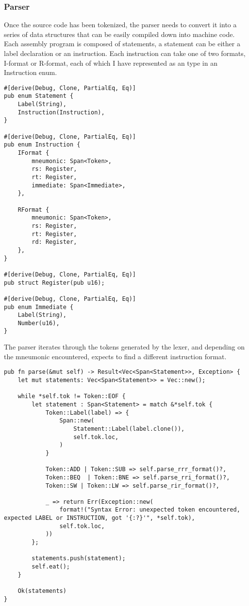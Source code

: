 \subsubsection{Parser}
Once the source code has been tokenized, the parser needs to convert it into a series of data structures that can be easily compiled down into machine code. Each assembly program is composed of statements, a statement can be either a label declaration or an instruction. Each instruction can take one of two formats, I-format or R-format, each of which I have represented as an type in an Instruction enum.

\begin{lstlisting}
#[derive(Debug, Clone, PartialEq, Eq)]
pub enum Statement {
    Label(String),
    Instruction(Instruction),
}

#[derive(Debug, Clone, PartialEq, Eq)]
pub enum Instruction {
    IFormat {
        mneumonic: Span<Token>,
        rs: Register,
        rt: Register,
        immediate: Span<Immediate>,
    },

    RFormat {
        mneumonic: Span<Token>,
        rs: Register,
        rt: Register,
        rd: Register,
    },
}

#[derive(Debug, Clone, PartialEq, Eq)]
pub struct Register(pub u16);

#[derive(Debug, Clone, PartialEq, Eq)]
pub enum Immediate {
    Label(String),
    Number(u16),
}
\end{lstlisting}

The parser iterates through the tokens generated by the lexer, and depending on the mneumonic encountered, expects to find a different instruction format.

\begin{lstlisting}
pub fn parse(&mut self) -> Result<Vec<Span<Statement>>, Exception> {
    let mut statements: Vec<Span<Statement>> = Vec::new();

    while *self.tok != Token::EOF {
        let statement : Span<Statement> = match &*self.tok {
            Token::Label(label) => {
                Span::new(
                    Statement::Label(label.clone()),
                    self.tok.loc,
                )
            }

            Token::ADD | Token::SUB => self.parse_rrr_format()?,
            Token::BEQ  | Token::BNE => self.parse_rri_format()?,
            Token::SW | Token::LW => self.parse_rir_format()?,

            _ => return Err(Exception::new(
                format!("Syntax Error: unexpected token encountered, expected LABEL or INSTRUCTION, got '{:?}'", *self.tok),
                self.tok.loc,
            ))
        };

        statements.push(statement);
        self.eat();
    }

    Ok(statements)
}
\end{lstlisting}

